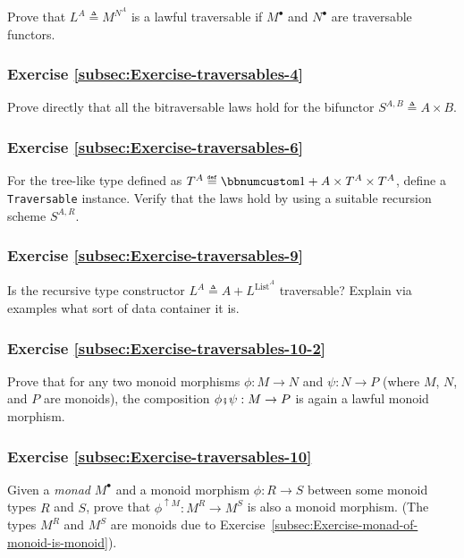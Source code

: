 Prove that $L^{A}\triangleq M^{N^{A}}$ is a lawful traversable if
$M^{\bullet}$ and $N^{\bullet}$ are traversable functors.

\subsubsection{Exercise \label{subsec:Exercise-traversables-4}\ref{subsec:Exercise-traversables-4}}

Prove directly that all the bitraversable laws hold for the bifunctor
$S^{A,B}\triangleq A\times B$.

\subsubsection{Exercise \label{subsec:Exercise-traversables-6}\ref{subsec:Exercise-traversables-6}}

For the tree-like type defined as $T^{A}\triangleq\bbnum 1+A\times T^{A}\times T^{A}$,
define a \lstinline!Traversable! instance. Verify that the laws hold
by using a suitable recursion scheme $S^{A,R}$.

\subsubsection{Exercise \label{subsec:Exercise-traversables-9}\ref{subsec:Exercise-traversables-9}}

Is the recursive type constructor $L^{A}\triangleq A+L^{\text{List}^{A}}$
traversable? Explain via examples what sort of data container it is.

\subsubsection{Exercise \label{subsec:Exercise-traversables-10-2}\ref{subsec:Exercise-traversables-10-2}}

Prove that for any two monoid morphisms $\phi:M\rightarrow N$ and
$\psi:N\rightarrow P$ (where $M$, $N$, and $P$ are monoids), the
composition $\phi\bef\psi:M\rightarrow P$ is again a lawful monoid
morphism.

\subsubsection{Exercise \label{subsec:Exercise-traversables-10}\ref{subsec:Exercise-traversables-10}}

Given a \emph{monad} $M^{\bullet}$ and a monoid morphism $\phi:R\rightarrow S$
between some monoid types $R$ and $S$, prove that $\phi^{\uparrow M}:M^{R}\rightarrow M^{S}$
is also a monoid morphism. (The types $M^{R}$ and $M^{S}$ are monoids
due to Exercise~\ref{subsec:Exercise-monad-of-monoid-is-monoid}).

